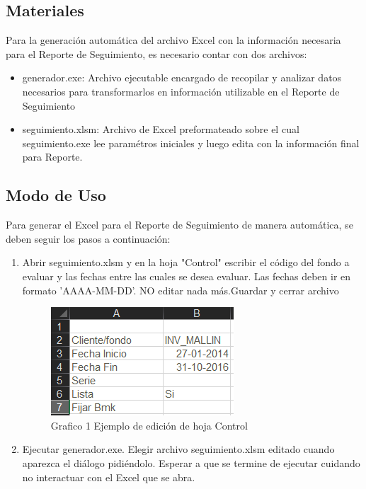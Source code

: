 \documentclass{article}
\begin{document}
\subsection{Materiales}

Para la generación automática del archivo Excel con la información necesaria para el Reporte de Seguimiento, es necesario contar con dos archivos:

\begin{itemize}
\item generador.exe: Archivo ejecutable encargado de recopilar y analizar datos necesarios para transformarlos en información utilizable en el Reporte de Seguimiento
\item seguimiento.xlsm: Archivo de Excel preformateado sobre el cual seguimiento.exe lee paramétros iniciales y luego edita con la información final para Reporte.
\end{itemize}  

\subsection{Modo de Uso}
Para generar el Excel para el Reporte de Seguimiento de manera automática, se deben seguir los pasos a continuación:

\begin{enumerate}
\item Abrir seguimiento.xlsm y en la hoja "Control" escribir el código del fondo a evaluar y las fechas entre las cuales se desea evaluar. Las fechas deben ir en formato 'AAAA-MM-DD'. NO editar nada más.Guardar y cerrar archivo

\begin{center}
\begin{figure}[h!]
\graphicspath{ {./} }
\centerline{\includegraphics[scale=0.8]{Control}}
\caption{Grafico 1 Ejemplo de edición de hoja Control}
\end{figure}
\end{center}

\item Ejecutar generador.exe. Elegir archivo seguimiento.xlsm editado cuando aparezca el diálogo pidiéndolo. Esperar a que se termine de ejecutar cuidando no interactuar con el Excel que se abra.

\end{enumerate}
\end{document}
